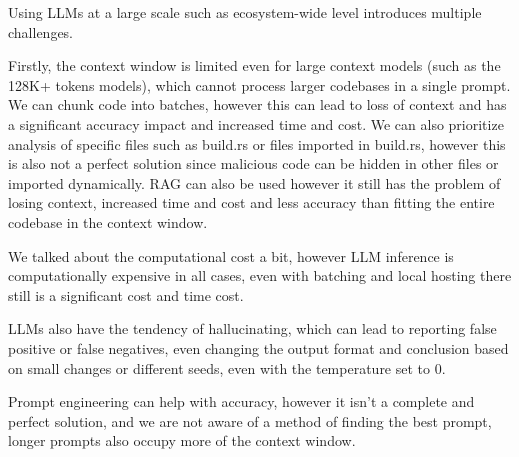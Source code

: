 Using LLMs at a large scale such as ecosystem-wide level introduces multiple challenges.

Firstly, the context window is limited even for large context models (such as the 128K+ tokens models), which cannot process larger codebases in a single prompt. We can chunk code into batches, however this can lead to loss of context and has a significant accuracy impact and increased time and cost. We can also prioritize analysis of specific files such as build.rs or files imported in build.rs, however this is also not a perfect solution since malicious code can be hidden in other files or imported dynamically.
RAG can also be used however it still has the problem of losing context, increased time and cost and less accuracy than fitting the entire codebase in the context window.

We talked about the computational cost a bit, however LLM inference is computationally expensive in all cases, even with batching and local hosting there still is a significant cost and time cost.

LLMs also have the tendency of hallucinating, which can lead to reporting false positive or false negatives, even changing the output format and conclusion based on small changes or different seeds, even with the temperature set to 0.

Prompt engineering can help with accuracy, however it isn't a complete and perfect solution, and we are not aware of a method of finding the best prompt, longer prompts also occupy more of the context window.

\begin{table}[h]
\centering
\small
{}
\caption{Limitations of LLMs in vulnerability detection and secure code generation.}
\label{tab:llm_limitations}
\end{table}

